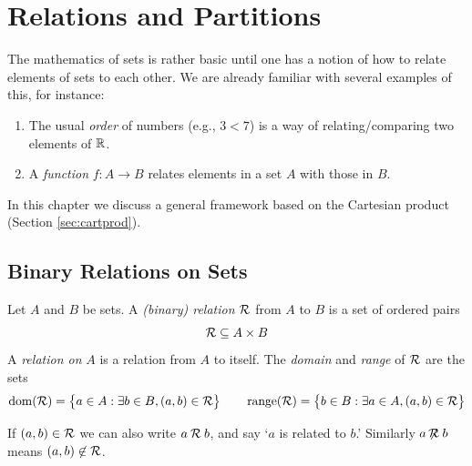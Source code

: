 \graphicspath{{7relations/asy/}}

\section{Relations and Partitions}\label{chap:relations}

The mathematics of sets is rather basic until one has a notion of how to relate elements of sets to each other. We are already familiar with several examples of this, for instance:
\begin{enumerate}\itemsep0pt
  \item The usual \emph{order} of numbers (e.g., $3<7$) is a way of relating/comparing two elements of $\mathbb{R}$.
  \item A \emph{function} $f:A\to B$ relates elements in a set $A$ with those in $B$.
\end{enumerate}

In this chapter we discuss a general framework based on the Cartesian product (Section \ref{sec:cartprod}).

\subsection{Binary Relations on Sets}\label{sec:relations}

\begin{defn}{}{}
	Let $A$ and $B$ be sets. A \emph{(binary) relation} $\mathcal{R}$ from $A$ to $B$ is a set of ordered pairs
	\[
		\mathcal{R}\subseteq A\times B
	\]
	A \emph{relation on} $A$ is a relation from $A$ to itself. The \emph{domain} and \emph{range} of $\mathcal{R}$ are the sets
	\begin{gather*}
		\operatorname{dom}(\mathcal{R})=\bigl\{a\in A:\exists b\in B, (a,b)\in\mathcal{R}\bigr\} \qquad
		\operatorname{range}(\mathcal{R})=\bigl\{b\in B:\exists a\in A, (a,b)\in\mathcal{R}\bigr\}
	\end{gather*}
\end{defn}

If $(a,b)\in\mathcal{R}$ we can also write $a\mathbin{\mathcal{R}} b$, and say `$a$ is related to $b$.' Similarly $a\mathbin{\not\!\!\mathcal{R}} b$ means $(a,b)\not\in\mathcal{R}$.

